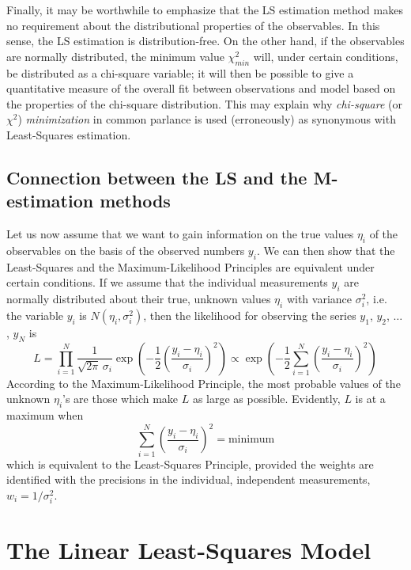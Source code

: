\documentclass[../main.tex]{subfiles}
\begin{document}
Finally,
it may be worthwhile to emphasize that the LS estimation method makes no requirement about the distributional properties of the observables.
In this sense, the LS estimation is distribution-free.
On the other hand, if the observables are normally distributed,
the minimum value $\chi^2_{min}$ will, under certain conditions, be distributed as a chi-square variable;
it will then be possible to give a quantitative measure of the overall fit between observations and model based on the properties of the chi-square distribution.
This may explain why \emph{chi-square} (or $\chi^2$) \emph{minimization} in common parlance
is used (erroneously) as synonymous with Least-Squares estimation.

\subsection{Connection between the LS and the M-estimation methods} \label{sec:10.1.2}

Let us now assume that we want to gain information on the true values $\eta_i$ of the observables
on the basis of the observed numbers $y_i$.
We can then show that the Least-Squares and the Maximum-Likelihood Principles are equivalent under certain conditions.
If we assume that the individual measurements $y_i$ are normally distributed
about their true, unknown values $\eta_i$ with variance $\sigma^2_i$,
i.e. the variable $y_i$ is $N(\eta_i,\sigma^2_i)$,
then the likelihood for observing the series $y_1$, $y_2$, $\ldots$, $y_N$ is
%
\begin{equation}
    L
    = \prod_{i=1}^N \frac{1}{\sqrt{2\pi} \, \sigma_i} \exp(-\frac{1}{2} \left(\frac{y_i - \eta_i}{\sigma_i}\right)^2)
    \propto \exp(-\frac{1}{2} \sum_{i=1}^N \left(\frac{y_i - \eta_i}{\sigma_i}\right)^2)
\end{equation}
%
According to the Maximum-Likelihood Principle,
the most probable values of the unknown $\eta_i$'s are those which make $L$ as large as possible.
Evidently, $L$ is at a maximum when
%
\begin{equation}
    \sum_{i=1}^N \left(\frac{y_i - \eta_i}{\sigma_i}\right)^2
    = \text{minimum}
\end{equation}
%
which is equivalent to the Least-Squares Principle,
provided the weights are identified with the precisions in the individual, independent measurements, $w_i = 1 / \sigma_i^2$.

\section{The Linear Least-Squares Model} \label{sec:10.2}
\end{document}

